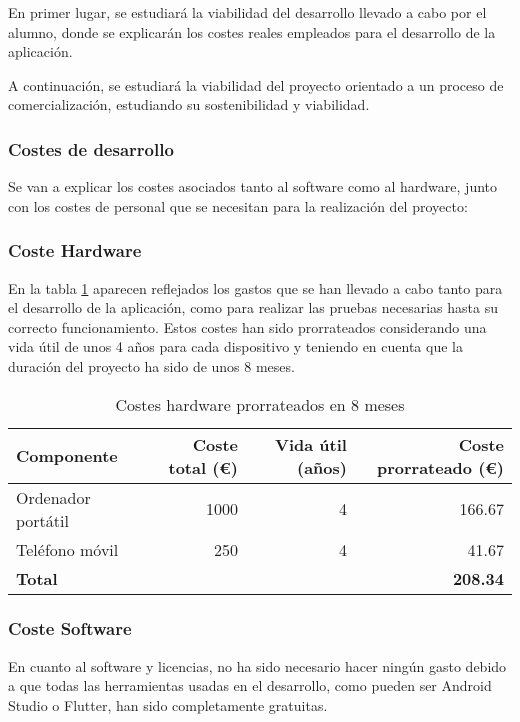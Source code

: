 En primer lugar, se estudiará la viabilidad del desarrollo llevado a cabo por el alumno, donde se explicarán los costes reales empleados para el desarrollo de la aplicación. 

A continuación, se estudiará la viabilidad del proyecto orientado a un proceso de comercialización, estudiando su sostenibilidad y viabilidad.



\subsubsection{Costes de desarrollo}

Se van a explicar los costes asociados tanto al software como al hardware, junto con los costes de personal que se necesitan para la realización del proyecto:

\subsubsection{Coste Hardware}
En la tabla \ref{tab:CostosHardware} aparecen reflejados los gastos que se han llevado a cabo tanto para el desarrollo de la aplicación, como para realizar las pruebas necesarias hasta su correcto funcionamiento. Estos costes han sido prorrateados considerando una vida útil de unos 4 años para cada dispositivo y teniendo en cuenta que la duración del proyecto ha sido de unos 8 meses.

\begin{table}[H]
\centering
\begin{tabular}{|l|r|r|r|}
\hline
\textbf{Componente} & \textbf{Coste total (€)} & \textbf{Vida útil (años)} & \textbf{Coste prorrateado (€)} \\ \hline
Ordenador portátil & 1000 & 4 & 166.67 \\ \hline
Teléfono móvil & 250 & 4 & 41.67 \\ \hline
\textbf{Total} & & & \textbf{208.34} \\ \hline
\end{tabular}
\caption{Costes hardware prorrateados en 8 meses}
\label{tab:CostosHardware}
\end{table}

\subsubsection{Coste Software}
En cuanto al software y licencias, no ha sido necesario hacer ningún gasto debido a que todas las herramientas usadas en el desarrollo, como pueden ser Android Studio o Flutter, han sido completamente gratuitas.

